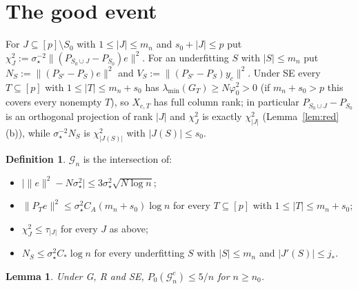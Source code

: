 \documentclass[11pt]{article}
\newtheorem{lemma}[theorem]{Lemma}
\theoremstyle{definition}
\newtheorem{definition}[theorem]{Definition}
\newcommand{\Pp}{P_0}
\newcommand{\1}{\mathbf 1}
\newcommand{\Gn}{\mathcal G_n}
\newcommand{\sst}{\sigma_\star^2}
\newcommand{\vp}{\varphi_0^2}
\begin{document}
\section{The good event}\label{sec:good}

For $J\subseteq[p]\setminus S_0$ with $1\le|J|\le m_n$ and $s_0+|J|\le p$ put $\chi^2_J:=\sigma_\star^{-2}\|(P_{S_0\cup J}-P_{S_0})e\|^2$. For an underfitting $S$ with $|S|\le m_n$ put $N_S:=\|(P_{S'}-P_S)e\|^2$ and $V_S:=\|(P_{S'}-P_S)y_c\|^2$. Under SE every $T\subseteq[p]$ with $1\le|T|\le m_n+s_0$ has $\lambda_{\min}(G_T)\ge N\vp>0$ (if $m_n+s_0>p$ this covers every nonempty $T$), so $X_{c,T}$ has full column rank; in particular $P_{S_0\cup J}-P_{S_0}$ is an orthogonal projection of rank $|J|$ and $\chi^2_J$ is exactly $\chi^2_{|J|}$ (Lemma~\ref{lem:red}(b)), while $\sigma_\star^{-2}N_S$ is $\chi^2_{|J(S)|}$ with $|J(S)|\le s_0$.

\begin{definition}
$\Gn$ is the intersection of:
\begin{itemize}
\item[(G1)] $\big|\|e\|^2-N\sst\big|\le3\sst\sqrt{N\log n}$;
\item[(G2)] $\|P_Te\|^2\le\sst C_A(m_n+s_0)\log n$ for every $T\subseteq[p]$ with $1\le|T|\le m_n+s_0$;
\item[(G3)] $\chi^2_J\le\tau_{|J|}$ for every $J$ as above;
\item[(G4)] $N_S\le\sst C_*\log n$ for every underfitting $S$ with $|S|\le m_n$ and $|J'(S)|\le j_*$.
\end{itemize}
\end{definition}

\begin{lemma}\label{lem:Gprob}
Under G, R and SE, $\Pp(\Gn^c)\le5/n$ for $n\ge n_0$.
\end{lemma}
\end{document}

